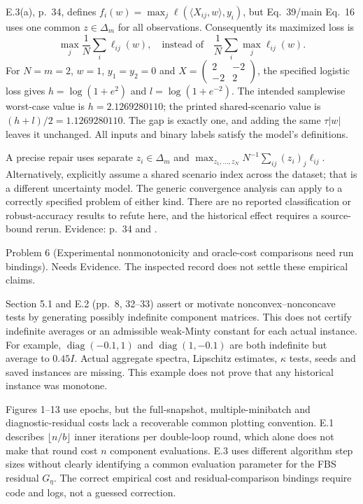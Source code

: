 \documentclass[10pt]{article}
\begin{document}
E.3(a), p. 34, defines \(f_i(w)=\max_j\ell(\langle X_{ij},w\rangle,y_i)\), but Eq. 39/main Eq. 16 uses one common \(z\in\Delta_m\) for all observations. Consequently its maximized loss is \[\max_j\frac1N\sum_i\ell_{ij}(w),
 \quad\text{instead of}\quad
 \frac1N\sum_i\max_j\ell_{ij}(w).\] For \(N=m=2\), \(w=1\), \(y_1=y_2=0\) and \(X=\left(\begin{smallmatrix}2&-2\\-2&2\end{smallmatrix}\right)\), the specified logistic loss gives \(h=\log(1+e^2)\) and \(l=\log(1+e^{-2})\). The intended samplewise worst-case value is \(h=2.1269280110\); the printed shared-scenario value is \((h+l)/2=1.1269280110\). The gap is exactly one, and adding the same \(\tau|w|\) leaves it unchanged. All inputs and binary labels satisfy the model’s definitions.\par
A precise repair uses separate \(z_i\in\Delta_m\) and \(\max_{z_1,\ldots,z_N}N^{-1}\sum_{ij}(z_i)_j\ell_{ij}\). Alternatively, explicitly assume a shared scenario index across the dataset; that is a different uncertainty model. The generic convergence analysis can apply to a correctly specified problem of either kind. There are no reported classification or robust-accuracy results to refute here, and the historical effect requires a source-bound rerun. Evidence: p. 34 and .\par
Problem 6 (Experimental nonmonotonicity and oracle-cost comparisons need run bindings).  Needs Evidence. The inspected record does not settle these empirical claims.\par
Section 5.1 and E.2 (pp. 8, 32–33) assert or motivate nonconvex–nonconcave tests by generating possibly indefinite component matrices. This does not certify indefinite averages or an admissible weak-Minty constant for each actual instance. For example, \(\operatorname{diag}(-0.1,1)\) and \(\operatorname{diag}(1,-0.1)\) are both indefinite but average to \(0.45I\). Actual aggregate spectra, Lipschitz estimates, \(\kappa\) tests, seeds and saved instances are missing. This example does not prove that any historical instance was monotone.\par
Figures 1–13 use epochs, but the full-snapshot, multiple-minibatch and diagnostic-residual costs lack a recoverable common plotting convention. E.1 describes \(\lfloor n/b\rfloor\) inner iterations per double-loop round, which alone does not make that round cost \(n\) component evaluations. E.3 uses different algorithm step sizes without clearly identifying a common evaluation parameter for the FBS residual \(G_\eta\). The correct empirical cost and residual-comparison bindings require code and logs, not a guessed correction.\par
\end{document}
